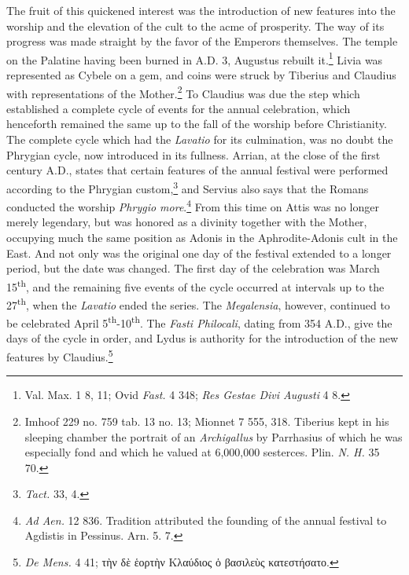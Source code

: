 \documentclass[a4paper, 11pt, oneside, polutonikogreek, english]{article}
\begin{document}
The fruit of this quickened interest was the introduction of new features into the worship and the elevation of the cult to the acme of prosperity. The way of its progress was made straight by the favor of the Emperors themselves. The temple on the Palatine having been burned in \textsc{A.D.} 3, Augustus rebuilt it.\footnote{Val. Max. 1 8, 11; Ovid \emph{Fast.} 4 348; \emph{Res Gestae Divi Augusti} 4 8.} Livia was represented as Cybele on a gem, and coins were struck by Tiberius and Claudius with representations of the Mother.\footnote{Imhoof 229 no. 759 tab. 13 no. 13; Mionnet 7 555, 318. Tiberius kept in his sleeping chamber the portrait of an \emph{Archigallus} by Parrhasius of which he was especially fond and which he valued at 6,000,000 sesterces. Plin. \emph{N. H.} 35 70.} To Claudius was due the step which established a complete cycle of events for the annual celebration, which henceforth remained the same up to the fall of the worship before Christianity. The complete cycle which had the \emph{Lavatio} for its culmination, was no doubt the Phrygian cycle, now introduced in its fullness. Arrian, at the close of the first century \textsc{A.D.}, states that certain features of the annual festival were performed according to the Phrygian custom,\footnote{\emph{Tact.} 33, 4.} and Servius also says that the Romans conducted the worship \emph{Phrygio more}.\footnote{\emph{Ad Aen.} 12 836. Tradition attributed the founding of the annual festival to Agdistis in Pessinus. Arn. 5. 7.} From this time on Attis was no longer merely legendary, but was honored as a divinity together with the Mother, occupying much the same position as Adonis in the Aphrodite-Adonis cult in the East. And not only was the original one day of the festival extended to a longer period, but the date was changed. The first day of the celebration was March 15\textsuperscript{th}, and the remaining five events of the cycle occurred at intervals up to the 27\textsuperscript{th}, when the \emph{Lavatio} ended the series. The \emph{Megalensia}, however, continued to be celebrated April 5\textsuperscript{th}-10\textsuperscript{th}. The \emph{Fasti Philocali}, dating from 354 \textsc{A.D.}, give the days of the cycle in order, and Lydus is authority for the introduction of the new features by Claudius.\footnote{\emph{De Mens.} 4 41; τὴν δὲ ἑορτὴν Κλαύδιος ὁ βασιλεὺς κατεστήσατο.}
\end{document}
